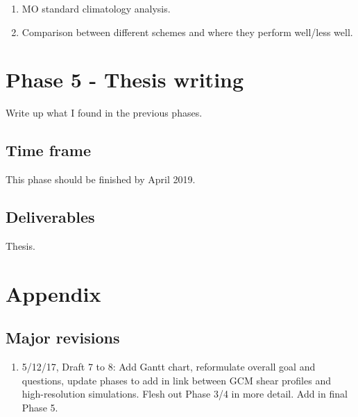 \documentclass[11pt,a4paper]{article}
\begin{document}
\begin{enumerate}
    \item MO standard climatology analysis.
    \item Comparison between different schemes and where they perform well/less well.
\end{enumerate}

\section*{Phase 5 - Thesis writing}

Write up what I found in the previous phases.

\subsection*{Time frame}

This phase should be finished by April 2019.

\subsection*{Deliverables}

Thesis.

\section*{Appendix}

\subsection*{Major revisions}
\begin{enumerate}
    \item 5/12/17, Draft 7 to 8: Add Gantt chart, reformulate overall goal and questions, update phases to add in link between GCM shear profiles and high-resolution simulations. Flesh out Phase 3/4 in more detail. Add in final Phase 5.
\end{enumerate}
\end{document}
